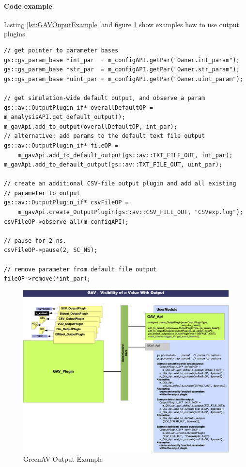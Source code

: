 \noindent
\begin{minipage}{\textwidth}
\paragraph{Code example}
Listing \ref{lst:GAVOuputExample} and figure \ref{fig:GAVOutputExample} show examples how to use output plugins.

\begin{lstlisting}[caption={Output plugin code example}, label=lst:GAVOuputExample]
// get pointer to parameter bases
gs::gs_param_base *int_par  = m_configAPI.getPar("Owner.int_param");
gs::gs_param_base *str_par  = m_configAPI.getPar("Owner.str_param");
gs::gs_param_base *uint_par = m_configAPI.getPar("Owner.uint_param");

// get simulation-wide default output, and observe a param
gs::av::OutputPlugin_if* overallDefaultOP = m_analysisAPI.get_default_output();
m_gavApi.add_to_output(overallDefaultOP, int_par);
// alternative: add params to the default text file output  
gs::av::OutputPlugin_if* fileOP =
    m_gavApi.add_to_default_output(gs::av::TXT_FILE_OUT, int_par);
m_gavApi.add_to_default_output(gs::av::TXT_FILE_OUT, uint_par);

// create an additional CSV-file output plugin and add all existing
// parameter to output
gs::av::OutputPlugin_if* csvFileOP = 
    m_gavApi.create_OutputPlugin(gs::av::CSV_FILE_OUT, "CSVexp.log");
csvFileOP->observe_all(m_configAPI);

// pause for 2 ns.
csvFileOP->pause(2, SC_NS);

// remove parameter from default file output
fileOP->remove(*int_par);
\end{lstlisting}
\end{minipage}

\begin{figure}[ht]
	\centerline{
		\includegraphics[width=\linewidth]{./images/GAVconcept(OutputExample)}}
	\caption{GreenAV Output Example}
	\label{fig:GAVOutputExample}
\end{figure}


